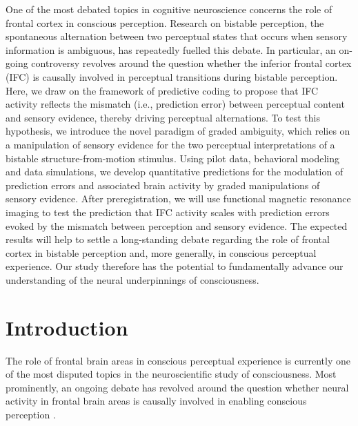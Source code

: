 \documentclass[12pt]{article}
\begin{document}
One of the most debated topics in cognitive neuroscience concerns the role of frontal cortex in conscious perception. Research on bistable perception, the spontaneous alternation between two perceptual states that occurs when sensory information is ambiguous, has repeatedly fuelled this debate. In particular, an on-going controversy revolves around the question whether the inferior frontal cortex (IFC) is causally involved in perceptual transitions during bistable perception.  Here, we draw on the framework of predictive coding to propose that IFC activity reflects the mismatch (i.e., prediction error) between perceptual content and sensory evidence, thereby driving perceptual alternations.  To test this hypothesis, we introduce the novel paradigm of graded ambiguity, which relies on a manipulation of sensory evidence for the two perceptual interpretations of a bistable structure-from-motion stimulus. Using pilot data, behavioral modeling and data simulations, we develop quantitative predictions for the modulation of prediction errors and associated brain activity by graded manipulations of sensory evidence. After preregistration, we will use functional magnetic resonance imaging to test the prediction that IFC activity scales with prediction errors evoked by the mismatch between perception and sensory evidence. The expected results will help to settle a long-standing debate regarding the role of frontal cortex in bistable perception and, more generally, in conscious perceptual experience. Our study therefore has the potential to fundamentally advance our understanding of the neural underpinnings of consciousness.

\renewcommand{\baselinestretch}{1.5}\normalsize

\clearpage
\section{Introduction}

The role of frontal brain areas in conscious perceptual experience is currently one of the most disputed topics in the neuroscientific study of consciousness. Most prominently, an ongoing debate has revolved around the question whether neural activity in frontal brain areas is causally involved in enabling conscious perception \parencite{Odegaard2017, Boly2017}.
\end{document}
